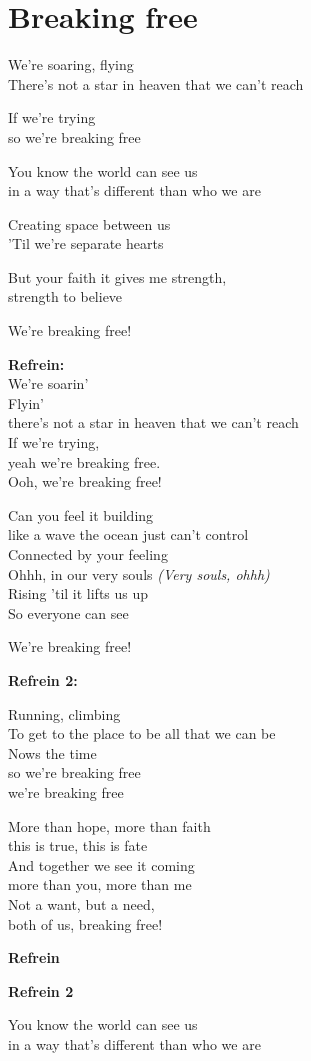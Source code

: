 \section{Breaking free}
We're soaring, flying\\
There's not a star in heaven that we can’t reach

If we're trying\\
so we're breaking free

You know the world can see us\\
in a way that's different than who we are

Creating space between us\\
'Til we're separate hearts

But your faith it gives me strength,\\
strength to believe

We're breaking free!

\textbf{Refrein:}\\
We're soarin'\\
Flyin'\\
there's not a star in heaven that we can’t reach\\
If we're trying,\\
yeah we're breaking free.\\
Ooh, we're breaking free!

Can you feel it building\\
like a wave the ocean just can’t control\\
Connected by your feeling\\
Ohhh, in our very souls \textit{(Very souls, ohhh)}\\
Rising 'til it lifts us up\\
So everyone can see

We're breaking free!

\textbf{Refrein 2:}

Running, climbing\\
To get to the place to be all that we can be\\
Nows the time\\
so we're breaking free\\
we're breaking free

More than hope, more than faith\\
this is true, this is fate\\
And together we see it coming\\
more than you, more than me\\
Not a want, but a need,\\
both of us, breaking free!

\textbf{Refrein}

\textbf{Refrein 2}

You know the world can see us\\
in a way that's different than who we are
